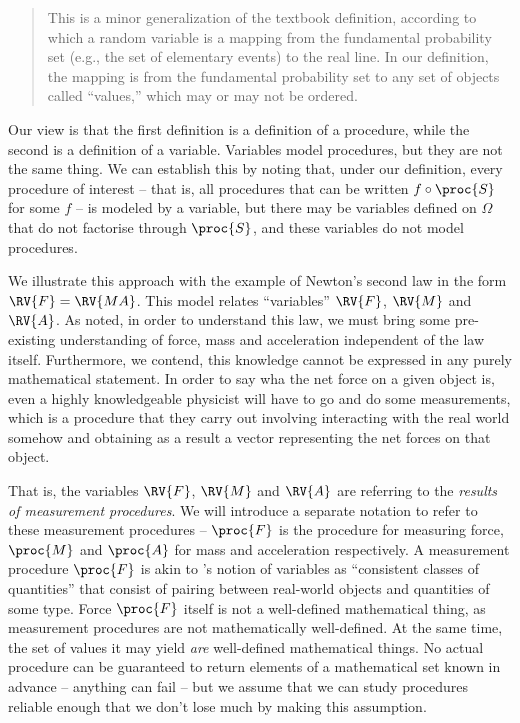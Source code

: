 \begin{quote}
This is a minor generalization of the textbook definition, according to which a random variable is a mapping from the fundamental probability set (e.g., the set of elementary events) to the real line. In our definition, the mapping is from the fundamental probability set to any set of objects called ``values,'' which may or may not be ordered.
\end{quote}

Our view is that the first definition is a definition of a procedure, while the second is a definition of a variable. Variables model procedures, but they are not the same thing. We can establish this by noting that, under our definition, every procedure of interest -- that is, all procedures that can be written $f\circ \proc{S}$ for some $f$ -- is modeled by a variable, but there may be variables defined on $\Omega$ that do not factorise through $\proc{S}$, and these variables do not model procedures.


We illustrate this approach with the example of Newton's second law in the form $\RV{F}=\RV{MA}$. This model relates ``variables'' $\RV{F}$, $\RV{M}$ and $\RV{A}$. As \citet{feynman_feynman_1979} noted, in order to understand this law, we must bring some pre-existing understanding of force, mass and acceleration independent of the law itself. Furthermore, we contend, this knowledge cannot be expressed in any purely mathematical statement. In order to say wha the net force on a given object is, even a highly knowledgeable physicist will have to go and do some measurements, which is a procedure that they carry out involving interacting with the real world somehow and obtaining as a result a vector representing the net forces on that object.

That is, the variables $\RV{F}$, $\RV{M}$ and $\RV{A}$ are referring to the \emph{results of measurement procedures}. We will introduce a separate notation to refer to these measurement procedures -- $\proc{F}$ is the procedure for measuring force, $\proc{M}$ and $\proc{A}$ for mass and acceleration respectively. A measurement procedure $\proc{F}$ is akin to \citet{menger_random_2003}'s notion of variables as ``consistent classes of quantities'' that consist of pairing between real-world objects and quantities of some type. Force $\proc{F}$ itself is not a well-defined mathematical thing, as measurement procedures are not mathematically well-defined. At the same time, the set of values it may yield \emph{are} well-defined mathematical things. No actual procedure can be guaranteed to return elements of a mathematical set known in advance -- anything can fail -- but we assume that we can study procedures reliable enough that we don't lose much by making this assumption.

